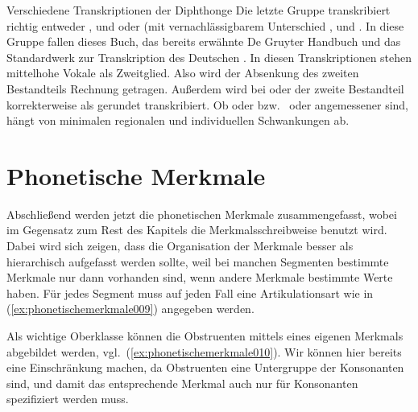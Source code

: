 \begin{Vertiefung}{Verschiedene Transkriptionen der Diphthonge}
Die letzte Gruppe transkribiert richtig entweder \textipa{[\t{ae}]}, \textipa{[\t{ao}]} und \textipa{[\t{O\o}]} oder (mit vernachlässigbarem Unterschied \textipa{[\t{aE}]}, \textipa{[\t{aO}]} und \textipa{[\t{O\oe}]}. 
In diese Gruppe fallen dieses Buch, das bereits erwähnte De Gruyter Handbuch \citep{KrechEa2009} und das Standardwerk zur Transkription des Deutschen \citet[16]{RuesEa2009}.
In diesen Transkriptionen stehen mittelhohe Vokale als Zweitglied.
Also wird der Absenkung des zweiten Bestandteils Rechnung getragen.
Außerdem wird bei \textipa{[\t{O\o}]} oder \textipa{[\t{O\oe}]} der zweite Bestandteil korrekterweise als gerundet transkribiert.
Ob \textipa{[\t{ae}]} oder \textipa{[\t{aE}]} bzw.\ \textipa{[\t{ao}]} oder \textipa{[\t{aO}]} angemessener sind, hängt von minimalen regionalen und individuellen Schwankungen ab.

\end{Vertiefung}


\section{Phonetische Merkmale}
\label{sec:phonetischemerkmale}


Abschließend werden jetzt die phonetischen Merkmale zusammengefasst, wobei im Gegensatz zum Rest des Kapitels die Merkmalsschreibweise benutzt wird.
Dabei wird sich zeigen, dass die Organisation der Merkmale besser als hierarchisch aufgefasst werden sollte, weil bei manchen Segmenten bestimmte Merkmale nur dann vorhanden sind, wenn andere Merkmale bestimmte Werte haben.
Für jedes Segment muss auf jeden Fall eine Artikulationsart wie in (\ref{ex:phonetischemerkmale009}) angegeben werden.

\begin{exe}
\end{exe}

Als wichtige Oberklasse können die Obstruenten mittels eines eigenen Merkmals abgebildet werden, vgl.\ (\ref{ex:phonetischemerkmale010}).
Wir können hier bereits eine Einschränkung machen, da Obstruenten eine Untergruppe der Konsonanten sind, und damit das entsprechende Merkmal auch nur für Konsonanten spezifiziert werden muss.


